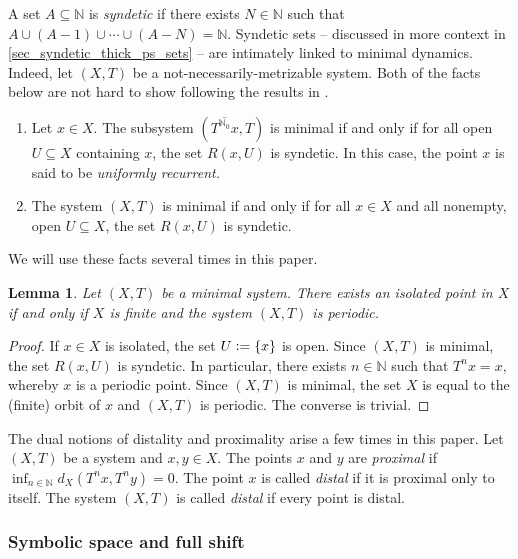 \documentclass[letter,11pt]{article}
\theoremstyle{plain}
\newtheorem{lemma}[theorem]{Lemma}
\theoremstyle{definition}
\theoremstyle{plain}
\theoremstyle{plain}
\numberwithin{equation}{section}
\newcommand{\N}{\mathbb{N}}
\newcommand{\defeq}{\vcentcolon=}
\begin{document}
A set $A \subseteq \N$ is \emph{syndetic} if there exists $N \in \N$ such that $A \cup (A-1) \cup \cdots \cup (A-N) = \N$.  Syndetic sets -- discussed in more context in \cref{sec_syndetic_thick_ps_sets} -- are intimately linked to minimal dynamics.  Indeed, let $(X,T)$ be a not-necessarily-metrizable system.  Both of the facts below are not hard to show following the results in \cite[Ch. 1, Sec. 4]{furstenberg_book_1981}.
\begin{enumerate}
    \item Let $x \in X$.  The subsystem $(\overline{T^{\N_0}x}, T)$ is minimal if and only if for all open $U \subseteq X$ containing $x$, the set $R(x,U)$ is syndetic. In this case, the point $x$ is said to be \emph{uniformly recurrent.}

    \item The system $(X,T)$ is minimal if and only if for all $x \in X$ and all nonempty, open $U \subseteq X$, the set $R(x,U)$ is syndetic.
\end{enumerate}
We will use these facts several times in this paper.

\begin{lemma}
    \label{lemma_isolated_points_and_minimal_systems}
    Let $(X,T)$ be a minimal system.  There exists an isolated point in $X$ if and only if $X$ is finite and the system $(X,T)$ is periodic.
\end{lemma}

\begin{proof}
    If $x \in X$ is isolated, the set $U \defeq \{x\}$ is open.  Since $(X,T)$ is minimal, the set $R(x,U)$ is syndetic. In particular, there exists $n \in \N$ such that $T^n x = x$, whereby $x$ is a periodic point.  Since $(X,T)$ is minimal, the set $X$ is equal to the (finite) orbit of $x$ and $(X,T)$ is periodic.  The converse is trivial.
\end{proof}

The dual notions of distality and proximality arise a few times in this paper.  Let $(X,T)$ be a system and $x, y \in X$.  The points $x$ and $y$ are \emph{proximal} if $\inf_{n \in \N} d_X(T^n x, T^n y) = 0$.  The point $x$ is called \emph{distal} if it is proximal only to itself.  The system $(X,T)$ is called \emph{distal} if every point is distal.

\subsubsection{Symbolic space and full shift}
\label{sec:symbolic_prelim}
\end{document}
